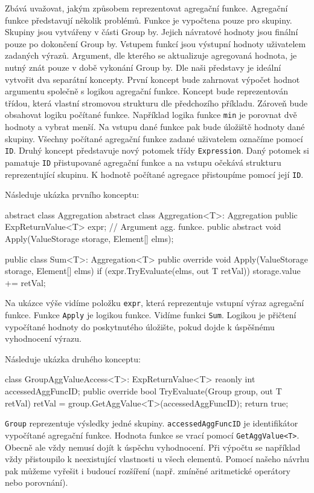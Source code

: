 Zbává uvažovat, jakým způsobem reprezentovat agregační funkce.
Agregační funkce představují několik problémů.
Funkce je vypočtena pouze pro skupiny. 
Skupiny jsou vytvářeny v části Group by.
Jejich návratové hodnoty jsou finální pouze po dokončení Group by. 
Vstupem funkcí jsou výstupní hodnoty uživatelem zadaných výrazů.
Argument, dle kterého se aktualizuje agregovaná hodnota, je nutný znát pouze v době vykonání Group by.
Dle naši představy je ideální vytvořit dva separátní koncepty.
První koncept bude zahrnovat výpočet hodnot argumentu společně s logikou agregační funkce.
Koncept bude reprezentován třídou, která vlastní stromovou strukturu dle předchozího příkladu.
Zároveň bude obsahovat logiku počítané funkce.
Například logika funkce \verb+min+ je porovnat dvě hodnoty a vybrat menší.
Na vstupu dané funkce pak bude úložiště hodnoty dané skupiny.
Všechny počítané agregační funkce zadané uživatelem označíme pomocí \verb+ID+.
Druhý koncept představuje nový potomek třídy \texttt{Expression}.
Daný potomek si pamatuje \verb+ID+ přistupované agregační funkce a na vstupu očekává strukturu reprezentující skupinu.
K hodnotě počítané agregace přistoupíme pomocí její \verb+ID+.

Následuje ukázka prvního konceptu:
\begin{code}
abstract class Aggregation { }
abstract class Aggregation<T>: Aggregation {
  public ExpReturnValue<T> expr; // Argument agg. funkce.
  public abstract void Apply(ValueStorage storage, Element[] elms);
}

public class Sum<T>: Aggregation<T>{
  public override void Apply(ValueStorage storage, Element[] elms) {
    if (expr.TryEvaluate(elms, out T retVal)) {
      storage.value += retVal;
    }
  }
}
\end{code}
\clearpage
\noindent Na ukázce výše vidíme položku \verb+expr+, která reprezentuje vstupní výraz agregační funkce.
Funkce \verb+Apply+ je logikou funkce. 
Vidíme funkci \verb+Sum+. 
Logikou je přičtení vypočítané hodnoty do poskytnutého úložište, pokud dojde k úspěšnému vyhodnocení výrazu.

Následuje ukázka druhého konceptu:
\begin{code}
class GroupAggValueAccess<T>: ExpReturnValue<T> {
  reaonly int accessedAggFuncID; 
  public override bool TryEvaluate(Group group, out T retVal) {
    retVal = group.GetAggValue<T>(accessedAggFuncID);
    return true; }}
\end{code}
\verb+Group+ reprezentuje výsledky jedné skupiny.
\verb+accessedAggFuncID+ je identifikátor vypočítané agregační funkce.
Hodnota funkce se vrací pomocí \verb+GetAggValue<T>+.
Obecně ale vždy nemusí dojít k úspěchu vyhodnocení.
Při výpočtu se například vždy přistoupilo k neexistující vlastnosti u všech elementů.
Pomocí našeho návrhu pak můžeme vyřešit i budoucí rozšíření (např. zmíněné aritmetické operátory nebo porovnání).

